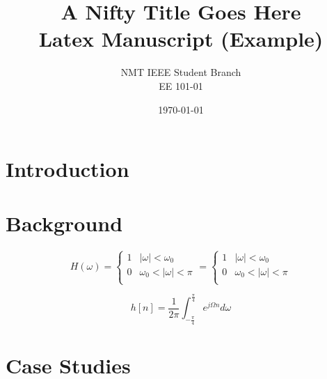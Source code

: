 \documentclass[11pt]{article}
\title{\LARGE \textbf{A Nifty Title Goes Here} 
        \\ Latex Manuscript (Example)}
\author{NMT IEEE Student Branch
        \\ EE 101-01}
\date{\today}
\begin{document}
\maketitle

\begin{abstract}
    \lipsum[1]
\end{abstract}

\newpage

\tableofcontents
\listoffigures
\listoftables

\newpage

\section*{Introduction}
\lipsum[2]
 
\section{Background}
\lipsum[3-4]

\begin{equation}\label{eq_1}
  H(\omega) =
  \begin{cases}
   1 & |\omega| < \omega_0 \\
   0 & \omega_0 < |\omega| < \pi \\
  \end{cases}
  =
    \begin{cases}
   1 & |\omega| < \omega_0 \\
   0 & \omega_0 < |\omega| < \pi \\
  \end{cases}
\end{equation}

\lipsum[5]

\begin{equation}\label{eq:2}
    h[n] = \frac{1}{2\pi} \int_{-\frac{\pi}{4}}^{\frac{\pi}{4}} e^{j\Omega n} d\omega
\end{equation} 



\section{Case Studies}
\lipsum[6]
\end{document}
